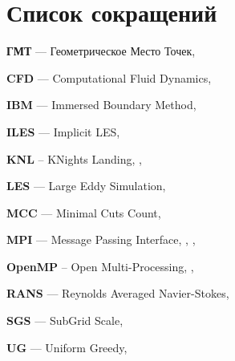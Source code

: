 \newpage

\section*{Список сокращений}

\textbf{ГМТ} --- Геометрическое Место Точек, \pageref{abbr:gmt}

\textbf{CFD} --- Computational Fluid Dynamics, \pageref{abbr:cfd}

\textbf{IBM} --- Immersed Boundary Method, \pageref{abbr:ibm}

\textbf{ILES} --- Implicit LES, \pageref{abbr:iles}

\textbf{KNL} -- KNights Landing, \pageref{abbr:knl}, \pageref{abbr:knl2}

\textbf{LES} --- Large Eddy Simulation, \pageref{abbr:les}

\textbf{MCC} --- Minimal Cuts Count, \pageref{abbr:mcc}

\textbf{MPI} --- Message Passing Interface, \pageref{abbr:mpi}, \pageref{abbr:mpi2}, \pageref{abbr:mpi3}

\textbf{OpenMP} -- Open Multi-Processing, \pageref{abbr:openmp}, \pageref{abbr:openmp2}

\textbf{RANS} --- Reynolds Averaged Navier-Stokes, \pageref{abbr:rans}

\textbf{SGS} --- SubGrid Scale, \pageref{abbr:sgs}

\textbf{UG} --- Uniform Greedy, \pageref{abbr:ug}
